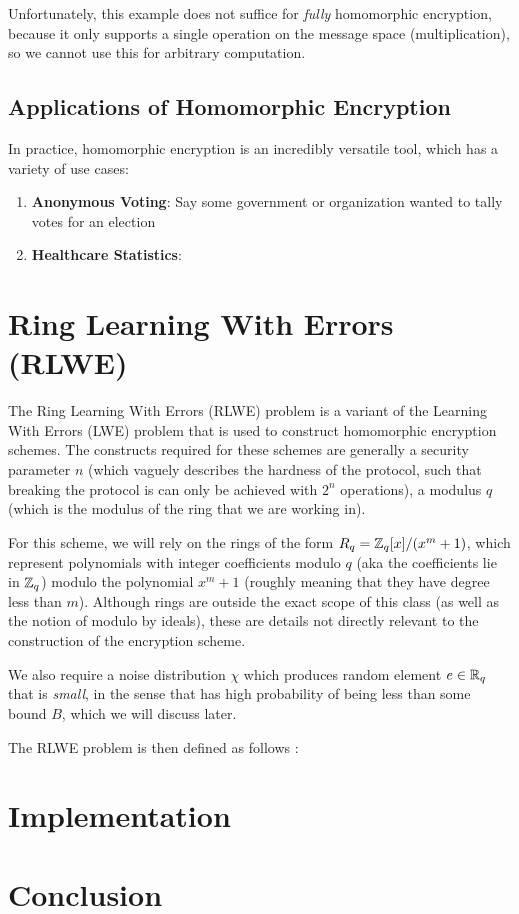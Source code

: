 \documentclass{theme}
\begin{document}
Unfortunately, this example does not suffice for \textit{fully} homomorphic encryption, because it only supports a single operation on the message space (multiplication), so we cannot use this for arbitrary computation.

\subsection{Applications of Homomorphic Encryption}

In practice, homomorphic encryption is an incredibly versatile tool, which has a variety of use cases:

\begin{enumerate}
    \item \textbf{Anonymous Voting}: Say some government or organization wanted to tally votes for an election
    \item \textbf{Healthcare Statistics}:
\end{enumerate}

\section{Ring Learning With Errors (RLWE)}

The Ring Learning With Errors (RLWE) problem is a variant of the Learning With Errors (LWE) problem that is used to construct homomorphic encryption schemes. The constructs required for these schemes are generally a security parameter $n$ (which vaguely describes the hardness of the protocol, such that breaking the protocol is can only be achieved with $2^n$ operations), a modulus $q$ (which is the modulus of the ring that we are working in).

For this scheme, we will rely on the rings of the form $R_q = \mathbb{Z}_q[x]/(x^m + 1)$, which represent polynomials with integer coefficients modulo $q$ (aka the coefficients lie in $\mathbb{Z}_q$) modulo the polynomial $x^m + 1$ (roughly meaning that they have degree less than $m$). Although rings are outside the exact scope of this class (as well as the notion of modulo by ideals), these are details not directly relevant to the construction of the encryption scheme.

We also require a noise distribution $\chi$ which produces random element $e \in \mathbb{R}_q$ that is \textit{small}, in the sense that has high probability of being less than some bound $B$, which we will discuss later.

The RLWE problem is then defined as follows :

\section{Implementation}

\section{Conclusion}


\printbibliography
\end{document}

